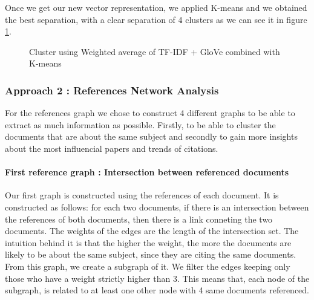 \documentclass[article,twocolumn]{IEEEtran}
\begin{document}
Once we get our new vector representation, we applied K-means and we
obtained the best separation, with a clear separation of 4 clusters as
we can see it in figure \ref{fig5}.


    \begin{figure}
        \begin{center}\end{center}
        \caption{Cluster using Weighted average of TF-IDF + GloVe  combined with K-means }
        \label{fig5}
    \end{figure}
    
    \hypertarget{approach-2-references-network-analysis}{%
\subsubsection{Approach 2 : References Network
Analysis}\label{approach-2-references-network-analysis}}

For the references graph we chose to construct 4 different graphs to be
able to extract as much information as possible. Firstly, to be able to
cluster the documents that are about the same subject and secondly to
gain more insights about the most influencial papers and trends of
citations.

    \hypertarget{first-reference-graph-intersection-between-referenced-documents}{%
\paragraph{First reference graph : Intersection between referenced
documents}\label{first-reference-graph-intersection-between-referenced-documents}}

Our first graph is constructed using the references of each document. It
is constructed as follows: for each two documents, if there is an
intersection between the references of both documents, then there is a
link conneting the two documents. The weights of the edges are the
length of the intersection set. The intuition behind it is that the
higher the weight, the more the documents are likely to be about the
same subject, since they are citing the same documents. From this graph,
we create a subgraph of it. We filter the edges keeping only those who
have a weight strictly higher than 3. This means that, each node of the
subgraph, is related to at least one other node with 4 same documents
referenced.
\end{document}
